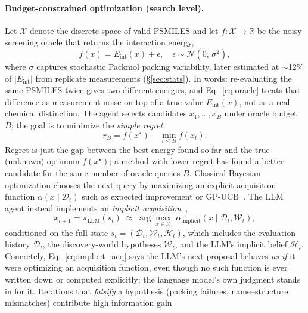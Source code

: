 \documentclass[twocolumn]{fairmeta}
\begin{document}
\paragraph{Budget-constrained optimization (search level).}
Let $\mathcal{X}$ denote the discrete space of valid PSMILES and let $f\!:\!\mathcal{X}\!\to\!\mathbb{R}$ be the noisy screening oracle that returns the interaction energy,
\begin{equation}
f(x) = E_\text{int}(x) + \epsilon, \quad \epsilon \sim \mathcal{N}(0,\,\sigma^2),
\label{eq:oracle}
\end{equation}
where $\sigma$ captures stochastic Packmol packing variability, later estimated at ${\sim}$12\% of $|E_\text{int}|$ from replicate measurements (\S\ref{sec:stats}).
In words: re-evaluating the same PSMILES twice gives two different energies, and Eq.~\ref{eq:oracle} treats that difference as measurement noise on top of a true value $E_\text{int}(x)$, not as a real chemical distinction.
The agent selects candidates $x_1,\ldots,x_B$ under oracle budget $B$; the goal is to minimize the \emph{simple regret}~\cite{shahriari2016bayesopt,srinivas2010gpucb}
\begin{equation}
r_B = f(x^\star) - \min_{t \le B} f(x_t).
\label{eq:regret}
\end{equation}
Regret is just the gap between the best energy found so far and the true (unknown) optimum $f(x^\star)$; a method with lower regret has found a better candidate for the same number of oracle queries $B$.
Classical Bayesian optimization chooses the next query by maximizing an explicit acquisition function $\alpha(x \mid \mathcal{D}_t)$ such as expected improvement or GP-UCB~\cite{srinivas2010gpucb}.
The LLM agent instead implements an \emph{implicit acquisition}~\cite{yang2024opro,liu2025igpo},
\begin{equation}
x_{t+1} = \pi_\text{LLM}(s_t) \;\approx\; \arg\max_{x\in\mathcal{X}}\; \alpha_\text{implicit}(x \mid \mathcal{D}_t, \mathcal{W}_t),
\label{eq:implicit_acq}
\end{equation}
conditioned on the full state $s_t = (\mathcal{D}_t, \mathcal{W}_t, \mathcal{H}_t)$, which includes the evaluation history $\mathcal{D}_t$, the discovery-world hypotheses $\mathcal{W}_t$, and the LLM's implicit belief $\mathcal{H}_t$.
Concretely, Eq.~\ref{eq:implicit_acq} says the LLM's next proposal behaves \emph{as if} it were optimizing an acquisition function, even though no such function is ever written down or computed explicitly; the language model's own judgment stands in for it.
Iterations that \emph{falsify} a hypothesis (packing failures, name--structure mismatches) contribute high information gain
\end{document}
